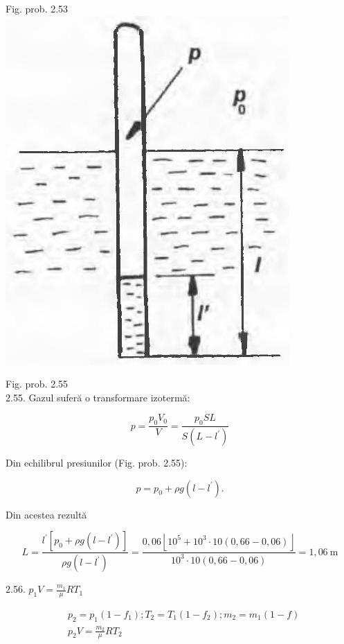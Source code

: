 \documentclass[10pt]{article}
\begin{document}
Fig. prob. 2.53\\
\includegraphics[max width=\textwidth, center]{2025_07_01_5b3ff9fa0d508c8e9f17g-281}

Fig. prob. 2.55\\
2.55. Gazul suferă o transformare izotermă:

$$
p=\frac{p_{0} V_{0}}{V}=\frac{p_{0} S L}{S\left(L-l^{\prime}\right)}
$$

Din echilibrul presiunilor (Fig. prob. 2.55):

$$
p=p_{0}+\rho g\left(l-l^{\prime}\right) .
$$

Din acestea rezultă

$$
L=\frac{l^{\prime}\left[p_{0}+\rho g\left(l-l^{\prime}\right)\right]}{\rho g\left(l-l^{\prime}\right)}=\frac{0,06\left\lfloor 10^{5}+10^{3} \cdot 10(0,66-0,06)\right\rfloor}{10^{3} \cdot 10(0,66-0,06)}=1,06 \mathrm{~m}
$$

2.56. $p_{1} V=\frac{m_{1}}{\mu} R T_{1}$

$$
\begin{aligned}
& p_{2}=p_{1}\left(1-f_{1}\right) ; T_{2}=T_{1}\left(1-f_{2}\right) ; m_{2}=m_{1}(1-f) \\
& p_{2} V=\frac{m_{2}}{\mu} R T_{2}
\end{aligned}
$$
\end{document}
